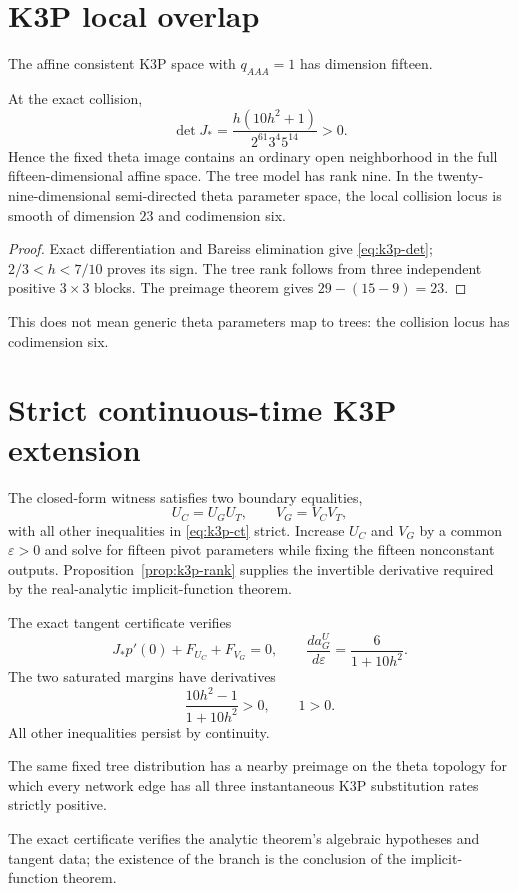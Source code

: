 \documentclass[11pt]{article}
\theoremstyle{remark}\newtheorem{remark}[theorem]{Remark}
\begin{document}
\section{K3P local overlap}\label{sec:k3p-rank}
The affine consistent K3P space with $q_{AAA}=1$ has dimension fifteen.
\begin{proposition}\label{prop:k3p-rank}
At the exact collision,
\begin{equation}\label{eq:k3p-det}\boxed{\det J_*=\frac{h(10h^2+1)}{2^{61}3^4 5^{14}}>0.}\end{equation}
Hence the fixed theta image contains an ordinary open neighborhood in the full fifteen-dimensional affine space. The tree model has rank nine. In the twenty-nine-dimensional semi-directed theta parameter space, the local collision locus is smooth of dimension $23$ and codimension six.
\end{proposition}
\begin{proof}
Exact differentiation and Bareiss elimination give \eqref{eq:k3p-det}; $2/3<h<7/10$ proves its sign. The tree rank follows from three independent positive $3\times3$ blocks. The preimage theorem gives $29-(15-9)=23$.
\end{proof}
This does not mean generic theta parameters map to trees: the collision locus has codimension six.

\section{Strict continuous-time K3P extension}\label{sec:k3p-ct}
The closed-form witness satisfies two boundary equalities,
\[
U_C=U_GU_T,\qquad V_G=V_CV_T,
\]
with all other inequalities in \eqref{eq:k3p-ct} strict. Increase $U_C$ and $V_G$ by a common $\varepsilon>0$ and solve for fifteen pivot parameters while fixing the fifteen nonconstant outputs. Proposition~\ref{prop:k3p-rank} supplies the invertible derivative required by the real-analytic implicit-function theorem.

The exact tangent certificate verifies
\[
J_*p'(0)+F_{U_C}+F_{V_G}=0,\qquad \frac{da_G^U}{d\varepsilon}=\frac6{1+10h^2}.
\]
The two saturated margins have derivatives
\[
\frac{10h^2-1}{1+10h^2}>0,\qquad1>0.
\]
All other inequalities persist by continuity.
\begin{corollary}\label{cor:k3p-ct}
The same fixed tree distribution has a nearby preimage on the theta topology for which every network edge has all three instantaneous K3P substitution rates strictly positive.
\end{corollary}
The exact certificate verifies the analytic theorem's algebraic hypotheses and tangent data; the existence of the branch is the conclusion of the implicit-function theorem.
\end{document}
